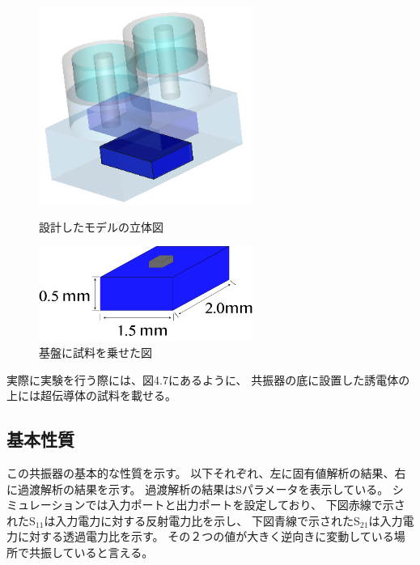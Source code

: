 \vspace{10 mm}

\begin{figure}[h]
 \begin{minipage}{0.5\hsize}
  \begin{center}
   \includegraphics[width=70mm]{./image/model73.png}
  \end{center}
  \caption{設計したモデルの立体図}
  \label{fig:one}
 \end{minipage}
 \begin{minipage}{0.5\hsize}
  \begin{center}
   \includegraphics[width=70mm]{./image/基板資料あり.png}
  \end{center}
  \caption{基盤に試料を乗せた図}
  \label{fig:two}
 \end{minipage}
\end{figure}

実際に実験を行う際には、図4.7にあるように、
共振器の底に設置した誘電体の上には超伝導体の試料を載せる。

\subsection{基本性質}
この共振器の基本的な性質を示す。
以下それぞれ、左に固有値解析の結果、右に過渡解析の結果を示す。
過渡解析の結果はSパラメータを表示している。
シミュレーションでは入力ポートと出力ポートを設定しており、
下図赤線で示されたS$_{11}$は入力電力に対する反射電力比を示し、
下図青線で示されたS$_{21}$は入力電力に対する透過電力比を示す。
その２つの値が大きく逆向きに変動している場所で共振していると言える。


